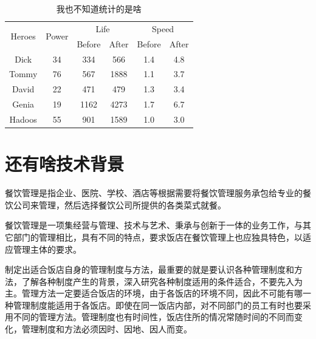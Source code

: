 \documentclass[a4paper,12pt]{book} %
\begin{document}
\begin{table}[htbp]
\centering
\caption{我也不知道统计的是啥}
\label{table_ex}
\begin{tabular}{cccccc}
\toprule
\multirow{2}{*}{Heroes} & \multirow{2}{*}{Power} & \multicolumn{2}{c}{Life}   & \multicolumn{2}{c}{Speed} \\
                             &                          & Before & After & Before    & After    \\ \midrule
Dick                           & 34                     & 334            & 566              & 1.4                 & 4.8                  \\
Tommy                           & 76                      & 567             & 1888              & 1.1                 & 3.7                  \\
David                           & 22                     & 471            & 479             & 1.3                 & 3.4                  \\
Genia                           & 19                     & 1162          & 4273            & 1.7                & 6.7                \\
Hadoos                         & 55                        & 901               & 1589                 & 1.0                 & 3.0                  \\ \bottomrule
\end{tabular}
\end{table}

\section{还有啥技术背景}

餐饮管理是指企业、医院、学校、酒店等根据需要将餐饮管理服务承包给专业的餐饮公司来管理，然后选择餐饮公司所提供的各类菜式就餐。

餐饮管理是一项集经营与管理、技术与艺术、秉承与创新于一体的业务工作，与其它部门的管理相比，具有不同的特点，要求饭店在餐饮管理上也应独具特色，以适应管理主体的要求。

制定出适合饭店自身的管理制度与方法，最重要的就是要认识各种管理制度和方法，了解各种制度产生的背景，深入研究各种制度适用的条件适合，不要先入为主。管理方法一定要适合饭店的环境，由于各饭店的环境不同，因此不可能有哪一种管理制度能适用于各饭店。即使在同一饭店内部，对不同部门的员工有时也要采用不同的管理方法。管理制度也有时间性，饭店住所的情况常随时间的不同而变化，管理制度和方法必须因时、因地、因人而变。
\end{document}
